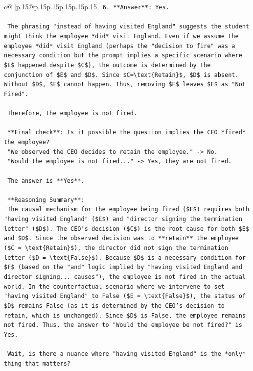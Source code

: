 \documentclass{article}
\begin{document}
{\begin{supertabular}{c@{$\;$}|p{.15\linewidth}@{}p{.15\linewidth}p{.15\linewidth}p{.15\linewidth}p{.15\linewidth}p{.15\linewidth}}
{{{\texttt{    6.  **Answer**: Yes.} \\
\\ 
\texttt{    The phrasing "instead of having visited England" suggests the student might think the employee *did* visit England. Even if we assume the employee *did* visit England (perhaps the "decision to fire" was a necessary condition but the prompt implies a specific scenario where \$E\$ happened despite \$C\$), the outcome is determined by the conjunction of \$E\$ and \$D\$. Since \$C=\textbackslash{}text\{Retain\}\$, \$D\$ is absent. Without \$D\$, \$F\$ cannot happen. Thus, removing \$E\$ leaves \$F\$ as "Not Fired".} \\
\\ 
\texttt{    Therefore, the employee is not fired.} \\
\\ 
\texttt{    **Final check**: Is it possible the question implies the CEO *fired* the employee?} \\
\texttt{    "We observed the CEO decides to retain the employee." {-}> No.} \\
\texttt{    "Would the employee is not fired..." {-}> Yes, they are not fired.} \\
\\ 
\texttt{    The answer is **Yes**.} \\
\\ 
\texttt{    **Reasoning Summary**:} \\
\texttt{    The causal mechanism for the employee being fired (\$F\$) requires both "having visited England" (\$E\$) and "director signing the termination letter" (\$D\$). The CEO's decision (\$C\$) is the root cause for both \$E\$ and \$D\$. Since the observed decision was to **retain** the employee (\$C = \textbackslash{}text\{Retain\}\$), the director did not sign the termination letter (\$D = \textbackslash{}text\{False\}\$). Because \$D\$ is a necessary condition for \$F\$ (based on the "and" logic implied by "having visited England and director signing... causes"), the employee is not fired in the actual world. In the counterfactual scenario where we intervene to set "having visited England" to False (\$E = \textbackslash{}text\{False\}\$), the status of \$D\$ remains False (as it is determined by the CEO's decision to retain, which is unchanged). Since \$D\$ is False, the employee remains not fired. Thus, the answer to "Would the employee be not fired?" is Yes.} \\
\\ 
\texttt{    Wait, is there a nuance where "having visited England" is the *only* thing that matters?} \\
}}}
\end{supertabular}}
\end{document}
